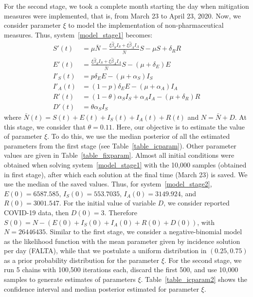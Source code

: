 \noindent For the second stage, we took a complete month starting the day
when mitigation measures were implemented, that is, from March 23 to
April 23, 2020. Now, we consider parameter $\xi$ to model the
implementation of non-pharmaceutical measures. Thus,
system~\eqref{model_stage1} becomes:
\begin{equation}\label{model_stage2}
  \begin{aligned}
	S'(t)&=\mu \bar{N}-\frac{\xi\hat{\beta}_S
	I_S+\xi\hat{\beta}_AI_A}{\bar{N}}S-\mu S + \delta_R R\\
	E'(t)&= \frac{\xi\hat{\beta}_S
	I_S+\xi\hat{\beta}_AI_A}{\bar{N}}S-(\mu+\delta_E) E \\
	I'_S(t)&= p \delta_E E-(\mu+\alpha_S) I_S\\
	I'_A(t)&= (1-p) \delta_E E-(\mu+\alpha_A) I_A \\
	R'(t)&= (1-\theta) \alpha_S I_S+\alpha_A I_A-(\mu+\delta_R) R \\
	D'(t)&= \theta \alpha_S I_S
  \end{aligned}
\end{equation}
where $\bar{N}(t)=S(t)+E(t)+I_S(t)+I_A(t)+R(t)$ and $N=\bar{N}+D$. At
this stage, we consider that $\theta = 0.11$. Here, our objective is to
estimate the value of parameter $\xi$. To do this, we use the median
posterior of all the estimated parameters from the first stage (see
Table~\eqref{table_icparam}). Other parameter values are given in
Table~\eqref{table_fixparam}. Almost all initial conditions were obtained
when solving system~\eqref{model_stage1} with the 10,000 samples
(obtained in first stage), after which each solution at the final time
(March 23) is saved. We use the median of the saved values. Thus, for
system~\eqref{model_stage2}, $E(0) = 6587.585$, $I_S(0) = 553.7035$,
$I_A(0) = 3149.924$, and $R(0) = 3001.547$. For the initial value of
variable $D$, we consider reported COVID-19 data, then $D(0) = 3$.
Therefore $S(0) = N - (E(0) + I_S(0) + I_A(0) + R(0) + D(0))$, with $N =
26446435$. Similar to the first stage, we consider a negative-binomial
model as the likelihood function with the mean parameter given by
incidence solution per day (FALTA), while that we postulate a uniform
distribution in $(0.25,0.75)$ as a prior probability distribution for the
parameter $\xi$.
\label{App:Parameter_Est}
For the second stage, we run 5 chains with 100,500 iterations each,
discard the first 500, and use 10,000 samples to generate estimates of
parameters $\xi$. Table~\eqref{table_icparam2} shows the confidence
interval and median posterior estimated for parameter $\xi$.
